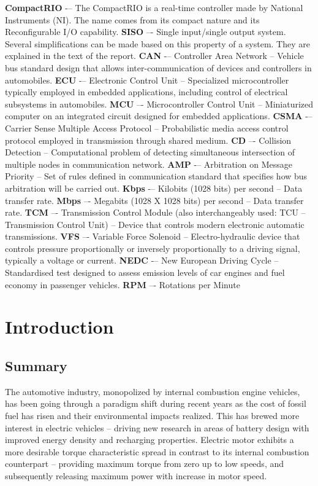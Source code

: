 \documentclass{article}
\begin{document}
\textbf{CompactRIO} -– The CompactRIO is a real-time controller made by National Instruments (NI). The name comes from its compact nature and its Reconfigurable I/O capability.
\vskip0.5cm
\noindent \textbf{SISO} –- Single input/single output system. Several simplifications can be made based on this property of a system. They are explained in the text of the report.
\vskip0.5cm
\noindent \textbf{CAN} -– Controller Area Network – Vehicle bus standard design that allows inter-communication of devices and controllers in automobiles.
\vskip0.5cm
\noindent \textbf{ECU} -– Electronic Control Unit – Specialized microcontroller typically employed in embedded applications, including control of electrical subsystems in automobiles.
\vskip0.5cm
\noindent \textbf{MCU} –- Microcontroller Control Unit – Miniaturized computer on an integrated circuit designed for embedded applications.
\vskip0.5cm
\noindent \textbf{CSMA} -– Carrier Sense Multiple Access Protocol – Probabilistic media access control protocol employed in transmission through shared medium.
\vskip0.5cm
\noindent \textbf{CD} –- Collision Detection – Computational problem of detecting simultaneous intersection of multiple nodes in communication network.
\vskip0.5cm
\noindent \textbf{AMP} -– Arbitration on Message Priority – Set of rules defined in communication standard that specifies how bus arbitration will be carried out.
\vskip0.5cm
\noindent \textbf{Kbps} -– Kilobits (1028 bits) per second – Data transfer rate.
\vskip0.5cm
\noindent \textbf{Mbps} –- Megabits (1028 X 1028 bits) per second – Data transfer rate.
\vskip0.5cm
\noindent \textbf{TCM} –- Transmission Control Module (also interchangeably used: TCU – Transmission Control Unit) – Device that controls modern electronic automatic transmissions.
\vskip0.5cm
\noindent \textbf{VFS} –- Variable Force Solenoid – Electro-hydraulic device that controls pressure proportionally or inversely proportionally to a driving signal, typically a voltage or current.
\vskip0.5cm
\noindent \textbf{NEDC} -– New European Driving Cycle – Standardised test designed to assess emission levels of car engines and fuel economy in passenger vehicles.
\vskip0.5cm
\noindent \textbf{RPM} –- Rotations per Minute

\newpage
\section{Introduction}

\subsection{Summary}
The automotive industry, monopolized by internal combustion engine vehicles, has been going through a paradigm shift during recent years as the cost of fossil fuel has risen and their environmental impacts realized. This has brewed more interest in electric vehicles – driving new research in areas of battery design with improved energy density and recharging properties. Electric motor exhibits a more desirable torque characteristic spread in contrast to its internal combustion counterpart – providing maximum torque from zero up to low speeds, and subsequently releasing maximum power with increase in motor speed.\\
\end{document}
